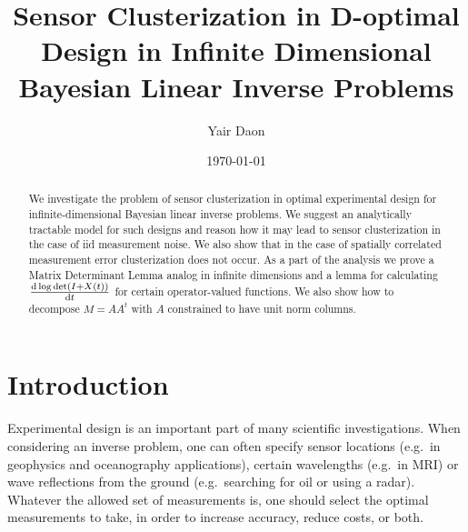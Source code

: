\documentclass{amsart}
\numberwithin{equation}{section}
\begin{document}
\title[Sensor Clusterization in D-optimal design in infinite
  dimensions]{Sensor Clusterization in D-optimal Design in Infinite
  Dimensional Bayesian Linear Inverse Problems}

\author{Yair Daon}
\address{Porter School of the Environment and Earth
  Sciences, Tel Aviv University\\ Tel Aviv, Israel}

\date{\today}

\begin{abstract}
  We investigate the problem of sensor clusterization in optimal
  experimental design for infinite-dimensional Bayesian linear inverse
  problems. We suggest an analytically tractable model for such
  designs and reason how it may lead to sensor clusterization in the
  case of iid measurement noise. We also show that in the case of
  spatially correlated measurement error clusterization does not
  occur. As a part of the analysis we prove a Matrix Determinant Lemma
  analog in infinite dimensions and a lemma for calculating
  $\frac{\text{\textup{d}} \log \det (I + X(t))}{\text{\textup{d}} t}$ for certain
  operator-valued functions. We also show how to decompose $M = AA^t$
  with $A$ constrained to have unit norm columns.
\end{abstract}

\maketitle

\section{Introduction}\label{section:OED intro}
Experimental design is an important part of many scientific
investigations. When considering an inverse problem, one can often
specify sensor locations (e.g.\ in geophysics and oceanography
applications), certain wavelengths (e.g.\ in MRI) or wave reflections
from the ground (e.g.\ searching for oil or using a radar). Whatever
the allowed set of measurements is, one should select the optimal
measurements to take, in order to increase accuracy, reduce costs, or
both.
\end{document}

